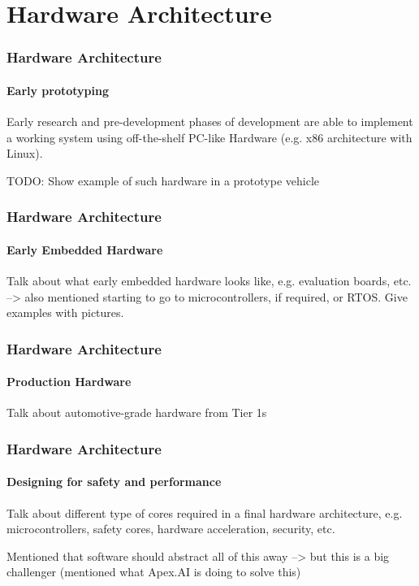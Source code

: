 \section{Hardware Architecture}

\begin{frame}
\frametitle{Hardware Architecture}
\framesubtitle{Early prototyping}
Early research and pre-development phases of development are able to
implement a working system using off-the-shelf PC-like Hardware
(e.g. x86 architecture with Linux).

TODO: Show example of such hardware in a prototype vehicle
\end{frame}

\begin{frame}
\frametitle{Hardware Architecture}
\framesubtitle{Early Embedded Hardware}
Talk about what early embedded hardware looks like, e.g. evaluation boards,
etc. --> also mentioned starting to go to microcontrollers, if required, or
RTOS. Give examples with pictures.
\end{frame}

\begin{frame}
\frametitle{Hardware Architecture}
\framesubtitle{Production Hardware}
Talk about automotive-grade hardware from Tier 1s
\end{frame}

\begin{frame}
\frametitle{Hardware Architecture}
\framesubtitle{Designing for safety and performance}
Talk about different type of cores required in a final hardware architecture,
e.g. microcontrollers, safety cores, hardware acceleration, security, etc.

Mentioned that software should abstract all of this away --> but this is a big
challenger (mentioned what Apex.AI is doing to solve this)
\end{frame}